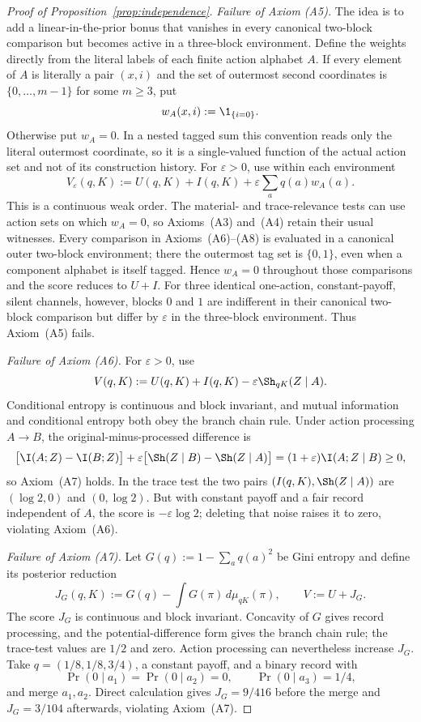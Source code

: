 \begin{proof}[Proof of Proposition~\ref{prop:independence}]
\emph{Failure of Axiom \textup{(A5)}.}
The idea is to add a linear-in-the-prior bonus that vanishes in every canonical
two-block comparison but becomes active in a three-block environment.
Define the weights directly from the literal labels of each finite action alphabet $A$.  If every element of
$A$ is literally a pair $(x,i)$ and the set of outermost second coordinates is
$\{0,\ldots,m-1\}$ for some $m\ge3$, put
\[
 w_A(x,i):=\1_{\{i=0\}}.
\]
Otherwise put $w_A=0$.  In a nested tagged sum this convention reads only the literal outermost coordinate, so
it is a single-valued function of the actual action set and not of its construction history.  For
$\varepsilon>0$, use within each environment
\[
 V_\varepsilon(q,K):=U(q,K)+I(q,K)+\varepsilon\sum_aq(a)w_A(a).
\]
This is a continuous weak order.  The material- and trace-relevance tests can use action sets on which
$w_A=0$, so Axioms~\textup{(A3)} and~\textup{(A4)} retain their usual witnesses.
Every comparison in Axioms~\textup{(A6)--(A8)} is evaluated in a canonical outer two-block environment;
there the outermost tag set is $\{0,1\}$, even when a component alphabet is itself tagged.  Hence $w_A=0$
throughout those comparisons and the score reduces to $U+I$.  For three identical one-action,
constant-payoff, silent channels, however, blocks $0$ and $1$ are indifferent
in their canonical two-block comparison but differ by $\varepsilon$ in the
three-block environment.  Thus Axiom~\textup{(A5)} fails.

\emph{Failure of Axiom \textup{(A6)}.}
For $\varepsilon>0$, use
\begin{equation}
 V(q,K):=U(q,K)+I(q,K)-\varepsilon\Sh_{qK}(Z\mid A).
 \label{eq:no-record-dp}
\end{equation}
Conditional entropy is continuous and block invariant, and mutual information
and conditional entropy both obey the branch chain rule.  Under action processing $A\to B$, the
original-minus-processed difference is
\[
 \bigl[\I(A;Z)-\I(B;Z)\bigr]
 +\varepsilon\bigl[\Sh(Z\mid B)-\Sh(Z\mid A)\bigr]
 =(1+\varepsilon)\I(A;Z\mid B)\ge0,
\]
so Axiom~\textup{(A7)} holds.  In the trace test the two pairs
$(I(q,K),\Sh(Z\mid A))$ are $(\log2,0)$ and $(0,\log2)$.  But with constant
payoff and a fair record independent of $A$, the score is
$-\varepsilon\log2$; deleting that noise raises it to zero, violating
Axiom~\textup{(A6)}.

\emph{Failure of Axiom \textup{(A7)}.}
Let $G(q):=1-\sum_aq(a)^2$ be Gini entropy and define its posterior reduction
\[
 J_G(q,K):=G(q)-\int G(\pi)\,d\mu_{qK}(\pi),
 \qquad V:=U+J_G.
\]
The score $J_G$ is continuous and block invariant.  Concavity of $G$ gives
record processing, and the potential-difference form gives the branch chain
rule; the trace-test values are $1/2$ and zero.
Action processing can nevertheless increase $J_G$.  Take
$q=(1/8,1/8,3/4)$, a constant payoff, and a binary record with
\[
 \Pr(0\mid a_1)=\Pr(0\mid a_2)=0,
 \qquad \Pr(0\mid a_3)=1/4,
\]
and merge $a_1,a_2$.  Direct calculation gives $J_G=9/416$ before the merge
and $J_G=3/104$ afterwards, violating Axiom~\textup{(A7)}.


\end{proof}
